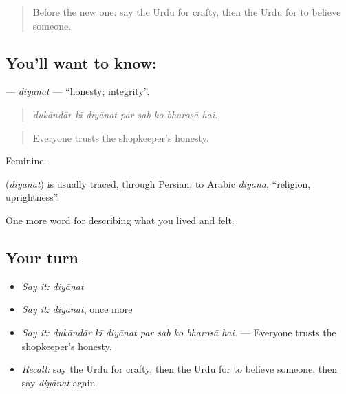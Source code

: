 \label{lesson:UR-C457-diyanat}



\begin{quote}
Before the new one: say the Urdu for crafty, then the Urdu for to believe someone.
\end{quote}

\subsection*{You'll want to know: }
\textbf{} — \emph{diyānat} — \textquotedblleft{}honesty; integrity\textquotedblright{}.

\begin{quote}
       
\end{quote}

\begin{quote}
\emph{dukāndār kī diyānat par sab ko bharosā hai.}
\end{quote}

\begin{quote}
Everyone trusts the shopkeeper's honesty.
\end{quote}

Feminine.

\begin{cousinweb}
\textbf{} (\emph{diyānat}) is usually traced, through Persian, to Arabic \emph{diyāna}, \textquotedblleft{}religion, uprightness\textquotedblright{}.
\end{cousinweb}

\begin{grammarlens}[title={What you've built}]
One more word for describing what you lived and felt.
\end{grammarlens}

\subsection*{Your turn}
\begin{itemize}
\raggedright
  \item \emph{Say it:} \emph{diyānat}
  \item \emph{Say it:} \emph{diyānat}, once more
  \item \emph{Say it:} \emph{dukāndār kī diyānat par sab ko bharosā hai.} — Everyone trusts the shopkeeper's honesty.
  \item \emph{Recall:} say the Urdu for crafty, then the Urdu for to believe someone, then say \emph{diyānat} again
\end{itemize}

